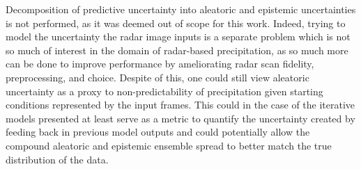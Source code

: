 Decomposition of predictive uncertainty into aleatoric and epistemic uncertainties is not performed, as it was deemed out of scope for this work. Indeed, trying to model the uncertainty the radar image inputs is a separate problem which is not so much of interest in the domain of radar-based precipitation, as so much more can be done to improve performance by ameliorating radar scan fidelity, preprocessing, and choice. Despite of this, one could still view aleatoric uncertainty as a proxy to non-predictability of precipitation given starting conditions represented by the input frames. This could in the case of the iterative models presented at least serve as a metric to quantify the uncertainty created by feeding back in previous model outputs and could potentially allow the compound aleatoric and epistemic ensemble spread to better match the true distribution of the data. 

